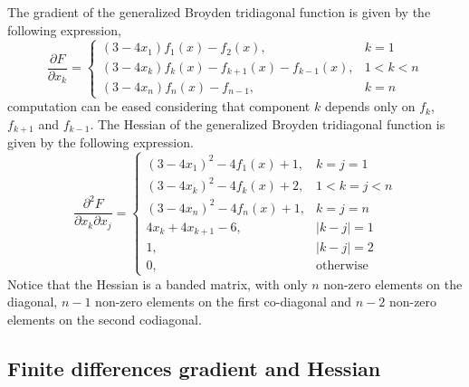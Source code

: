 The gradient of the generalized Broyden tridiagonal function is given by the following expression,
\begin{equation}
    \frac{\partial F}{\partial x_k} = \left \{ \begin{array}{ll}
    (3 - 4x_1)f_1(x) - f_2(x), & k = 1\\
    (3-4x_k)f_k(x) - f_{k+1}(x) - f_{k-1}(x), & 1 < k < n\\
    (3-4x_n)f_n(x) - f_{n-1}, & k = n
    \end{array} \right .
\end{equation}
computation can be eased considering that component $k$ depends only on $f_k$, $f_{k+1}$ and $f_{k-1}$.
The Hessian of the generalized Broyden tridiagonal function is given by the following expression.
\begin{equation}
    \frac{\partial^2 F}{\partial x_k \partial x_j} = \left \{ \begin{array}{ll}
    (3-4x_1)^2 - 4f_1(x) + 1, & k = j = 1 \\
    (3-4x_k)^2 - 4f_k(x) + 2, & 1 < k = j < n\\
    (3-4x_n)^2 - 4f_n(x) + 1, & k = j = n \\
    4x_k + 4x_{k+1} - 6, & |k-j| = 1\\
    1, & |k-j| = 2\\
    0, & \text{otherwise}
    \end{array} \right .
\end{equation}
Notice that the Hessian is a banded matrix, with only $n$ non-zero elements on the diagonal, $n-1$ non-zero elements on the first co-diagonal and $n-2$ non-zero elements on the second codiagonal.

\subsection{Finite differences gradient and Hessian}

